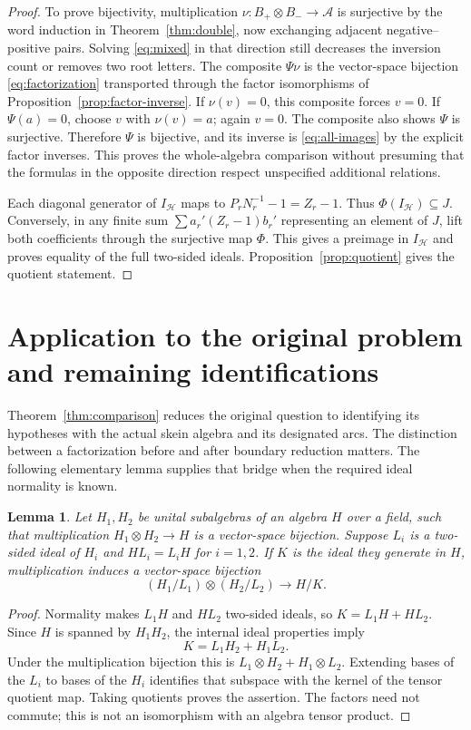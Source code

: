 \documentclass[11pt]{article}
\newtheorem{lemma}[theorem]{Lemma}
\theoremstyle{definition}
\theoremstyle{remark}
\newcommand{\cA}{\mathcal{A}}
\newcommand{\cH}{\mathcal{H}}
\begin{document}
\begin{proof}
To prove bijectivity, multiplication $\nu:B_+\otimes B_-\to\cA$ is surjective by the word induction in Theorem~\ref{thm:double}, now exchanging adjacent negative--positive pairs. Solving \eqref{eq:mixed} in that direction still decreases the inversion count or removes two root letters. The composite $\Psi\nu$ is the vector-space bijection \eqref{eq:factorization} transported through the factor isomorphisms of Proposition~\ref{prop:factor-inverse}. If $\nu(v)=0$, this composite forces $v=0$. If $\Psi(a)=0$, choose $v$ with $\nu(v)=a$; again $v=0$. The composite also shows $\Psi$ is surjective. Therefore $\Psi$ is bijective, and its inverse is \eqref{eq:all-images} by the explicit factor inverses. This proves the whole-algebra comparison without presuming that the formulas in the opposite direction respect unspecified additional relations.

Each diagonal generator of $I_{\cH}$ maps to $P_rN_r^{-1}-1=Z_r-1$. Thus $\Phi(I_{\cH})\subseteq J$. Conversely, in any finite sum $\sum a_r'(Z_r-1)b_r'$ representing an element of $J$, lift both coefficients through the surjective map $\Phi$. This gives a preimage in $I_{\cH}$ and proves equality of the full two-sided ideals. Proposition~\ref{prop:quotient} gives the quotient statement.
\end{proof}

\section{Application to the original problem and remaining identifications}\label{sec:application}

Theorem~\ref{thm:comparison} reduces the original question to identifying its hypotheses with the actual skein algebra and its designated arcs. The distinction between a factorization before and after boundary reduction matters. The following elementary lemma supplies that bridge when the required ideal normality is known.

\begin{lemma}\label{lem:quotient-factorization}
Let $H_1,H_2$ be unital subalgebras of an algebra $H$ over a field, such that multiplication $H_1\otimes H_2\to H$ is a vector-space bijection. Suppose $L_i$ is a two-sided ideal of $H_i$ and $HL_i=L_iH$ for $i=1,2$. If $K$ is the ideal they generate in $H$, multiplication induces a vector-space bijection
\[
 (H_1/L_1)\otimes(H_2/L_2)\longrightarrow H/K.
\]
\end{lemma}
\begin{proof}
Normality makes $L_1H$ and $HL_2$ two-sided ideals, so $K=L_1H+HL_2$. Since $H$ is spanned by $H_1H_2$, the internal ideal properties imply
\[
 K=L_1H_2+H_1L_2.
\]
Under the multiplication bijection this is $L_1\otimes H_2+H_1\otimes L_2$. Extending bases of the $L_i$ to bases of the $H_i$ identifies that subspace with the kernel of the tensor quotient map. Taking quotients proves the assertion. The factors need not commute; this is not an isomorphism with an algebra tensor product.
\end{proof}
\end{document}
